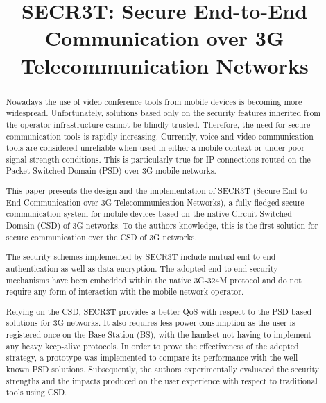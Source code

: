 \documentclass[10pt, conference, compsocconf]{IEEEtran}
\title{SECR3T: Secure End-to-End Communication over 3G Telecommunication Networks}
\author{
  \IEEEauthorblockN{
    Giuseppe Cattaneo%
    , Giancarlo De Maio%
    , Fabio Petagna%
  }
  \IEEEauthorblockA{
    Universit\'a di Salerno\\
    Dipartimento di Informatica e Applicazioni\\
    cattaneo@dia.unisa.it%
    , g.demaio@gmail.com%
    , fabpet@dia.unisa.it%
  }
}
\begin{document}
\maketitle

\begin{abstract}

Nowadays the use of video conference tools from mobile devices is becoming more widespread. Unfortunately, solutions based only on the security features inherited from the operator infrastructure cannot be blindly trusted. Therefore, the need for secure communication tools is rapidly increasing.
Currently, voice and video communication tools are considered unreliable when used in either a mobile context or under poor signal strength conditions. This is particularly true for IP connections routed on the Packet-Switched Domain (PSD) over 3G mobile networks.

This paper presents the design and the implementation of SECR3T (Secure End-to-End Communication over 3G Telecommunication Networks), a fully-fledged secure communication system for mobile devices based on the native Circuit-Switched Domain (CSD) of 3G networks.
To the authors knowledge, this is the first solution for secure communication over the CSD of 3G networks.

The security schemes implemented by SECR3T include mutual end-to-end authentication as well as data encryption. The adopted end-to-end security mechanisms have been embedded within the native 3G-324M protocol and do not require any form of interaction with the mobile network operator.

Relying on the CSD, SECR3T provides a better QoS with respect to the PSD based solutions for 3G networks. It also requires less power consumption as the user is registered once on the Base Station (BS), with the handset not having to implement any heavy keep-alive protocols.
In order to prove the effectiveness of the adopted strategy, a prototype was implemented to compare its performance with the well-known PSD solutions. Subsequently, the authors experimentally evaluated the security strengths and the impacts produced on the user experience with respect to traditional tools using CSD.


\end{abstract}
\end{document}
